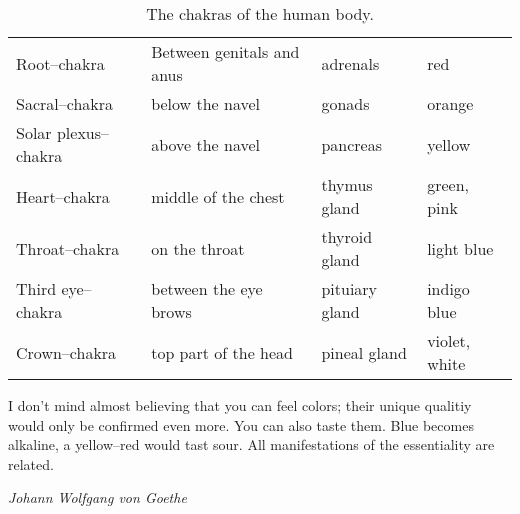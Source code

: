 \documentclass[../main.tex]{subfiles}
\begin{document}
 \begin{table}[htb]
  \centering
  \begin{tabular}{llll}
    Root--chakra & Between genitals and anus & adrenals & red \\
    Sacral--chakra & below the navel & gonads & orange \\
    Solar plexus--chakra & above the navel & pancreas & yellow \\
    Heart--chakra & middle of the chest & thymus gland & green, pink \\
    Throat--chakra & on the throat & thyroid gland & light blue \\
    Third eye--chakra & between the eye brows & pituiary gland & indigo blue \\
    Crown--chakra & top part of the head & pineal gland & violet, white
  \end{tabular}
  \caption{The chakras of the human body.}
\end{table}


\epigraph{I don't mind almost believing that you can feel colors; their unique qualitiy would only be confirmed even more. You can also taste them. Blue becomes alkaline, a yellow--red would tast sour. All manifestations of the essentiality are related.}{\textit{Johann Wolfgang von Goethe}}
\end{document}

